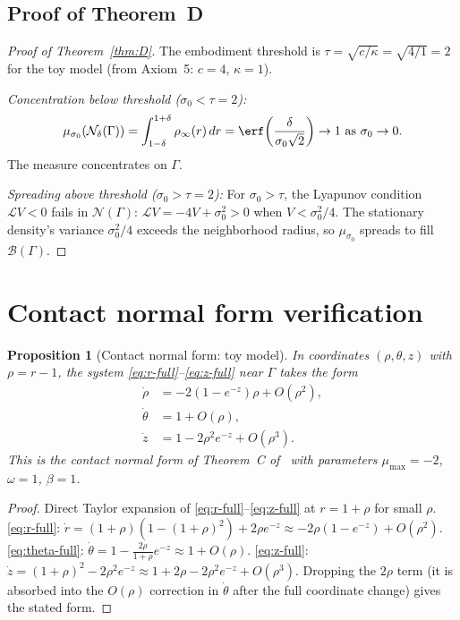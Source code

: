 \documentclass[12pt, oneside]{book}
\theoremstyle{plain}
\newtheorem{proposition}[theorem]{Proposition}
\theoremstyle{definition}
\theoremstyle{remark}
\newcommand{\Orb}{\Gamma}
\newcommand{\cN}{\mathcal{N}}
\newcommand{\cB}{\mathcal{B}}
\newcommand{\cL}{\mathcal{L}}
\begin{document}
\subsection{Proof of Theorem~D}

\begin{proof}[Proof of Theorem~\ref{thm:D}]
The embodiment threshold is $\tau=\sqrt{c/\kappa}=\sqrt{4/1}=2$
for the toy model (from Axiom~5: $c=4$, $\kappa=1$).

\emph{Concentration below threshold ($\sigma_0<\tau=2$):}
\[
  \mu_{\sigma_0}(\cN_\delta(\Orb))
  = \int_{1-\delta}^{1+\delta}\rho_\infty(r)\,dr
  = \erf\!\left(\frac{\delta}{\sigma_0\sqrt{2}}\right)\to 1
  \text{ as }\sigma_0\to 0.
\]
The measure concentrates on $\Orb$.

\emph{Spreading above threshold ($\sigma_0>\tau=2$):}
For $\sigma_0>\tau$, the Lyapunov condition $\cL V<0$ fails in
$\cN(\Orb)$: $\cL V=-4V+\sigma_0^2>0$ when $V<\sigma_0^2/4$.
The stationary density's variance $\sigma_0^2/4$ exceeds the
neighborhood radius, so $\mu_{\sigma_0}$ spreads to fill $\cB(\Orb)$.
\end{proof}

\section{Contact normal form verification}\label{sec:normal}

\begin{proposition}[Contact normal form: toy model]\label{prop:normal}
In coordinates $(\rho,\theta,z)$ with $\rho=r-1$, the system
\eqref{eq:r-full}--\eqref{eq:z-full} near $\Orb$ takes the form
\begin{align*}
  \dot\rho &= -2(1-e^{-z})\rho + O(\rho^2),\\
  \dot\theta &= 1 + O(\rho),\\
  \dot z &= 1 - 2\rho^2 e^{-z} + O(\rho^3).
\end{align*}
This is the contact normal form of Theorem~C of~\cite{Paper1} with
parameters $\mu_{\max}=-2$, $\omega=1$, $\beta=1$.
\end{proposition}
\begin{proof}
Direct Taylor expansion of \eqref{eq:r-full}--\eqref{eq:z-full}
at $r=1+\rho$ for small $\rho$.
\eqref{eq:r-full}: $\dot r=(1+\rho)(1-(1+\rho)^2)+2\rho e^{-z}
\approx -2\rho(1-e^{-z})+O(\rho^2)$.
\eqref{eq:theta-full}: $\dot\theta=1-\frac{2\rho}{1+\rho}e^{-z}
\approx 1+O(\rho)$.
\eqref{eq:z-full}: $\dot z=(1+\rho)^2-2\rho^2 e^{-z}
\approx 1+2\rho-2\rho^2 e^{-z}+O(\rho^3)$.
Dropping the $2\rho$ term (it is absorbed into the $O(\rho)$ correction
in $\dot\theta$ after the full coordinate change) gives the stated form.
\end{proof}
\end{document}
